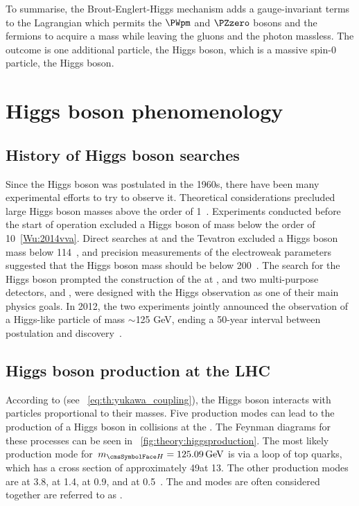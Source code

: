 To summarise, the Brout-Englert-Higgs mechanism adds a gauge-invariant terms to the \SM Lagrangian which permits the $\PWpm$ and $\PZzero$ bosons and the fermions to acquire a mass while leaving the gluons and the photon massless. The outcome is one additional particle, the Higgs boson, which is a massive spin-0 particle, the Higgs boson. 

 
\section{Higgs boson phenomenology}
\subsection{History of Higgs boson searches}

Since the Higgs boson was postulated in the 1960s, there have been many experimental efforts to try to observe it. Theoretical considerations precluded large Higgs boson masses above the order of 1\TeV~\cite{Heller:1993yv}. Experiments conducted before the start of \LEP operation excluded a Higgs boson of mass below the order of 10\GeV~\ref{Wu:2014vva}. Direct searches at \LEP and the Tevatron excluded a Higgs boson mass below 114\GeV~\cite{Barate:2003sz,TEVNPH:2012ab}, and precision measurements of the electroweak parameters suggested that the Higgs boson mass should be below 200\GeV~\cite{Renton:2004wd}. The search for the Higgs boson prompted the construction of the \LHC at \CERN, and two multi-purpose detectors, \ATLAS and \CMS, were designed with the Higgs observation as one of their main physics goals. In 2012, the two experiments jointly announced the observation of a Higgs-like particle of mass $\sim$125 GeV, ending a 50-year interval between postulation and discovery~\cite{CMSHDisc,ATLASHDisc}.

\subsection{Higgs boson production at the LHC}

According to \SM (see \Eq~\ref{eq:th:yukawa_coupling}), the Higgs boson interacts with particles proportional to their masses. Five production modes can lead to the production of a Higgs boson in \pp collisions at the \LHC. The Feynman diagrams for these processes can be seen in \Fig~\ref{fig:theory:higgsproduction}. The most likely production mode for  $\mH=125.09\GeV$ is \ggH via a loop of top quarks, which has a cross section of approximately 49\pb at 13\TeV. The other production modes are \VBF at 3.8\pb, \WH at 1.4\pb, \ZH at 0.9\pb , and \ttH at 0.5\pb~\cite{LHCHXSWGRY4}. The \WH and \ZH modes are often considered together are referred to as \VH.

